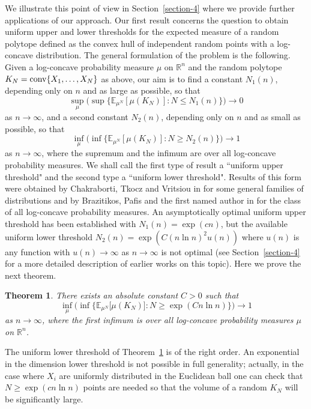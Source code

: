 \documentclass[11pt,leqno]{article}
\newtheorem{theorem}{Theorem}[section]
\theoremstyle{definition}
\theoremstyle{remark}
\numberwithin{equation}{section}
\newcommand{\ls}{\leqslant}
\newcommand{\gr}{\geqslant}
\newcommand{\1}{\textbf{1}}
\begin{document}
We illustrate this point of view in Section~\ref{section-4} where we provide further applications of our
approach. Our first result concerns the question to obtain uniform upper and lower thresholds
for the expected measure of a random polytope defined as the convex hull of independent random points with a log-concave distribution. The general formulation of the problem is the following. Given a log-concave probability measure $\mu $ on ${\mathbb R}^n$
and the random polytope $K_N={\rm conv}\{X_1,\ldots ,X_N\}$ as above, our aim is to find a constant $N_1(n)$, depending only on $n$
and as large as possible, so that
$$\sup_{\mu }\Big(\sup\Big\{{\mathbb E}_{\mu^N}[\mu (K_N)]:N\ls N_1(n)\Big\}\Big)\longrightarrow 0$$ as $n\to\infty $, 
and a second constant $N_2(n)$, depending only on $n$ and as small as possible, so that
$$\inf_{\mu}\Big(\inf\Big\{{\mathbb E}_{\mu^N}[\mu (K_N)]:N\gr N_2(n)\Big\}\Big)\longrightarrow 1$$ as $n\to\infty $,
where the supremum and the infimum are over all log-concave probability measures. We shall call the first type of result a ``uniform upper threshold" and the second type a ``uniform lower threshold". Results of this form were obtained
by Chakraborti, Tkocz and Vritsiou in \cite{Chakraborti-Tkocz-Vritsiou-2021} for some
general families of distributions and by Brazitikos, Pafis and the first named author in \cite{BGP-depth} for the
class of all log-concave probability measures. An asymptotically optimal uniform upper threshold has been established
with $N_1(n)=\exp(cn)$, but the available uniform lower threshold $N_2(n)=\exp (C(n\ln n)^2u(n))$
where $u(n)$ is any function with $u(n)\to\infty $ as $n\to\infty $ is not optimal (see Section~\ref{section-4} for
a more detailed description of earlier works on this topic). Here we prove the next theorem.

\begin{theorem}\label{th:rough}There exists an absolute constant $C>0$ such that
$$\inf_{\mu }\Big(\inf\Big\{ {\mathbb E}_{\mu^N}\big[\mu (K_N)\big]: N\gr \exp (Cn\ln n)\Big\}\Big)\longrightarrow 1$$
as $n\to\infty $, where the first infimum is over all log-concave probability measures $\mu $ on ${\mathbb R}^n$.
\end{theorem}

The uniform lower threshold of Theorem~\ref{th:rough} is of the right order. An exponential in the dimension lower threshold is not possible in full generality; actually, in the case where $X_i$ are uniformly distributed in the Euclidean ball one can check
that $N\gr\exp (cn\ln n)$ points are needed so that the volume of a random $K_N$ will be significantly large.
\end{document}
